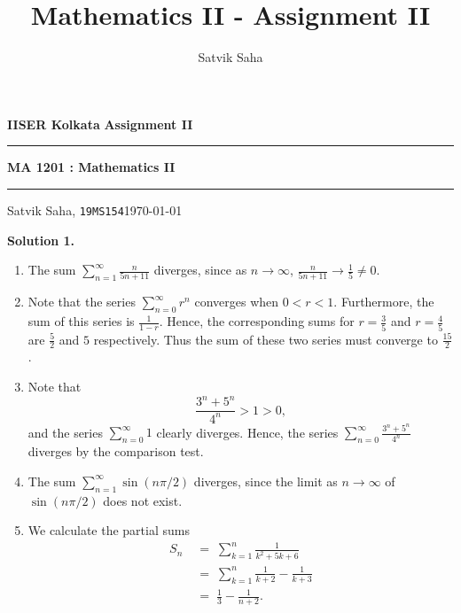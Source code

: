\documentclass[10pt]{article}
\title{Mathematics II - Assignment II}
\author{Satvik Saha}
\date{}
\begin{document}
        \par\textbf{IISER Kolkata} \hfill \textbf{Assignment II}
        \vspace{3pt}
        \hrule
        \vspace{3pt}
        \begin{center}
                \LARGE{\textbf{MA 1201 : Mathematics II}}
        \end{center}
        \vspace{3pt}
        \hrule
        \vspace{3pt}
        Satvik Saha, \texttt{19MS154}\hfill\today
        \vspace{20pt}

        \textbf{Solution 1.}
        \begin{enumerate}
                \item   The sum \(
                        \sum_{n = 1}^\infty \frac{n}{5n + 11}
                        \) diverges, since as $n \to \infty$, $\frac{n}{5n + 11} \to \frac{1}{5} \neq 0$.
                \item   Note that the series $\sum_{n = 0}^\infty r^n$ converges when $0 < r < 1$.
                        Furthermore, the sum of this series is $\frac{1}{1 - r}$. Hence, the corresponding sums
                        for $r = \frac{3}{5}$ and $r = \frac{4}{5}$ are $\frac{5}{2}$ and $5$ respectively.
                        Thus the sum of these two series must converge to $\frac{15}{2}$.
                \item   Note that
                        \[
                        \frac{3^n + 5^n}{4^n} > 1 > 0,
                        \]
                        and the series $\sum_{n = 0}^\infty 1$ clearly diverges. Hence, the series $\sum_{n = 0}^\infty \frac{3^n + 5^n}{4^n}$
                        diverges by the comparison test.
                \item The sum $\sum_{n = 1}^\infty \sin(n\pi/2)$ diverges, since the limit as $n \to \infty$ of $\sin(n\pi/2)$ does not exist.
                \item We calculate the partial sums
                        \begin{align*}
                                S_n \;&=\; \sum_{k = 1}^n \frac{1}{k^2 + 5k + 6} \\
                                        \;&=\; \sum_{k = 1}^n \frac{1}{k + 2} - \frac{1}{k + 3} \\
                                        \;&=\; \frac{1}{3} - \frac{1}{n + 2}.
                        \end{align*}

\end{enumerate}
\end{document}
